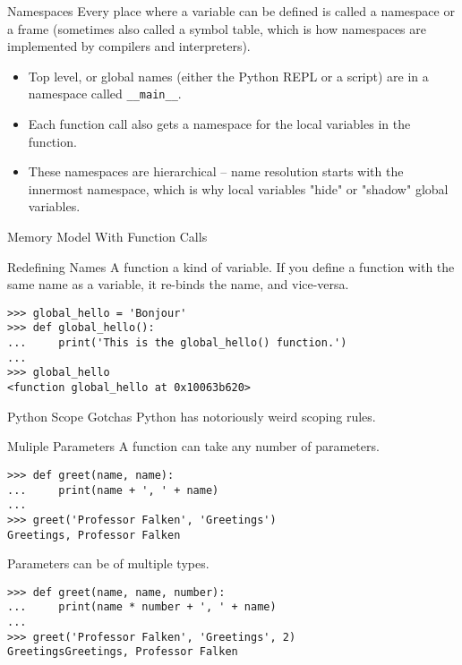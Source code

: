 \documentclass[smaller, aspectratio=1610]{beamer}
\begin{document}
\begin{frame}[label={sec:org43668d5},fragile]{Namespaces}
 Every place where a variable can be defined is called a \alert{namespace} or a \alert{frame} (sometimes also called a \alert{symbol table}, which is how namespaces are implemented by compilers and interpreters).

\begin{itemize}
\item Top level, or \alert{global} names (either the Python REPL or a script) are in a namespace called \texttt{\_\_main\_\_}.
\item Each function \alert{call} also gets a namespace for the local variables in the function.
\item These namespaces are hierarchical -- name resolution starts with the innermost namespace, which is why local variables "hide" or "shadow" global variables.
\end{itemize}
\end{frame}

\begin{frame}[label={sec:org6bfde85}]{Memory Model With Function Calls}
\end{frame}

\begin{frame}[label={sec:orgca768ed},fragile]{Redefining Names}
 A function a kind of variable. If you define a function with the same name as a variable, it re-binds the name, and vice-versa.

\lstset{language=Python,label= ,caption= ,captionpos=b,numbers=none}
\begin{lstlisting}
>>> global_hello = 'Bonjour'
>>> def global_hello():
...     print('This is the global_hello() function.')
...
>>> global_hello
<function global_hello at 0x10063b620>
\end{lstlisting}
\end{frame}

\begin{frame}[label={sec:org2738701}]{Python Scope Gotchas}
Python has notoriously weird scoping rules.
\end{frame}

\begin{frame}[label={sec:org3105715},fragile]{Muliple Parameters}
 A function can take any number of parameters.

\lstset{language=Python,label= ,caption= ,captionpos=b,numbers=none}
\begin{lstlisting}
>>> def greet(name, name):
...     print(name + ', ' + name)
...
>>> greet('Professor Falken', 'Greetings')
Greetings, Professor Falken
\end{lstlisting}

Parameters can be of multiple types.

\lstset{language=Python,label= ,caption= ,captionpos=b,numbers=none}
\begin{lstlisting}
>>> def greet(name, name, number):
...     print(name * number + ', ' + name)
...
>>> greet('Professor Falken', 'Greetings', 2)
GreetingsGreetings, Professor Falken
\end{lstlisting}
\end{frame}
\end{document}
